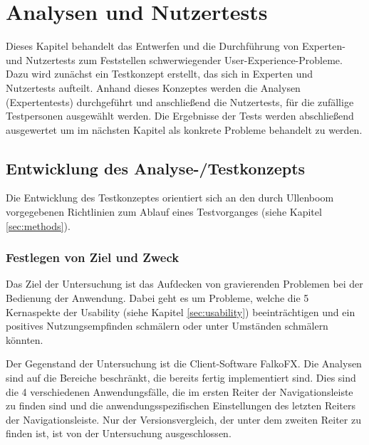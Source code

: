 \chapter{Analysen und Nutzertests}
Dieses Kapitel behandelt das Entwerfen und die Durchführung von Experten- und Nutzertests zum Feststellen schwerwiegender User-Experience-Probleme. Dazu wird zunächst ein Testkonzept erstellt, das sich in Experten und Nutzertests aufteilt. Anhand dieses Konzeptes werden die Analysen (Expertentests) durchgeführt und anschließend die Nutzertests, für die zufällige Testpersonen ausgewählt werden. Die Ergebnisse der Tests werden abschließend ausgewertet um im nächsten Kapitel als konkrete Probleme behandelt zu werden.\par
\section{Entwicklung des Analyse-/Testkonzepts} \label{sec:analysisConcept}
Die Entwicklung des Testkonzeptes orientiert sich an den durch Ullenboom vorgegebenen Richtlinien zum Ablauf eines Testvorganges (siehe Kapitel \ref{sec:methods}).\par
\subsection{Festlegen von Ziel und Zweck}
Das Ziel der Untersuchung ist das Aufdecken von gravierenden Problemen bei der Bedienung der Anwendung. Dabei geht es um Probleme, welche die 5 Kernaspekte der Usability (siehe Kapitel \ref{sec:usability}) beeinträchtigen und ein positives Nutzungsempfinden schmälern oder unter Umständen schmälern könnten.\par
Der Gegenstand der Untersuchung ist die Client-Software FalkoFX. Die Analysen sind auf die Bereiche beschränkt, die bereits fertig implementiert sind. Dies sind die 4 verschiedenen Anwendungsfälle, die im ersten Reiter der Navigationsleiste zu finden sind und die anwendungsspezifischen Einstellungen des letzten Reiters der Navigationsleiste. Nur der Versionsvergleich, der unter dem zweiten Reiter zu finden ist, ist von der Untersuchung ausgeschlossen.\par%
